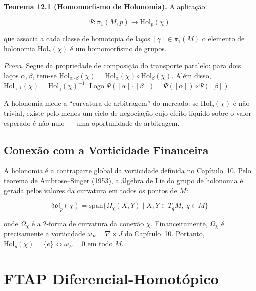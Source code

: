 \smallskip
\noindent\textbf{Teorema 12.1 (Homomorfismo de Holonomia).} A aplica\c{c}\~ao:

\begin{equation}\label{eq:homomorfismo-holonomia}
\Psi: \pi_1(M, p) \longrightarrow \text{Hol}_p(\chi)
\end{equation}

que associa a cada classe de homotopia de la\c{c}os $[\gamma] \in \pi_1(M)$ o elemento de holonomia $\text{Hol}_\gamma(\chi)$ \'e um homomorfismo de grupos.

\medskip
\noindent\textit{Prova.} Segue da propriedade de composi\c{c}\~ao do transporte paralelo: para dois la\c{c}os $\alpha, \beta$, tem-se $\text{Hol}_{\alpha \cdot \beta}(\chi) = \text{Hol}_\alpha(\chi) \circ \text{Hol}_\beta(\chi)$. Al\'em disso, $\text{Hol}_{\gamma^{-1}}(\chi) = \text{Hol}_\gamma(\chi)^{-1}$. Logo $\Psi([\alpha]\cdot[\beta]) = \Psi([\alpha])\circ\Psi([\beta])$. $\square$

A holonomia mede a ``curvatura de arbitragem'' do mercado: se $\text{Hol}_p(\chi)$ \'e n\~ao-trivial, existe pelo menos um ciclo de negocia\c{c}\~ao cujo efeito l\'iquido sobre o valor esperado \'e n\~ao-nulo --- uma oportunidade de arbitragem.

\subsection{Conex\~ao com a Vorticidade Financeira}

A holonomia \'e a contraparte global da vorticidade definida no Cap\'itulo~10. Pelo teorema de Ambrose--Singer (1953), a \'algebra de Lie do grupo de holonomia \'e gerada pelos valores da curvatura em todos os pontos de $M$:

\begin{equation}\label{eq:ambrose-singer}
\mathfrak{hol}_p(\chi) = \text{span}\{ \Omega_\chi(X,Y) \mid X,Y \in T_q M,\; q \in M \}
\end{equation}

onde $\Omega_\chi$ \'e a 2-forma de curvatura da conex\~ao $\chi$. Financeiramente, $\Omega_\chi$ \'e precisamente a vorticidade $\omega_F = \nabla \times J$ do Cap\'itulo~10. Portanto, $\text{Hol}_p(\chi) = \{e\} \Leftrightarrow \omega_F = 0$ em todo $M$.

\section{FTAP Diferencial-Homot\'opico}

